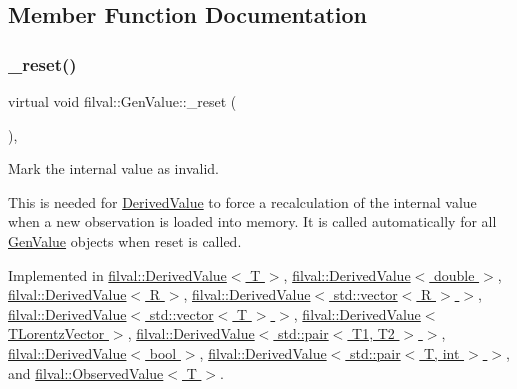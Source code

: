 \subsection{Member Function Documentation}
\hypertarget{classfilval_1_1GenValue_ae9d5bd9fde2d04f6cd05d5b901a8c78a}{}\label{classfilval_1_1GenValue_ae9d5bd9fde2d04f6cd05d5b901a8c78a} 
\subsubsection{\texorpdfstring{\+\_\+reset()}{\_reset()}}
{\footnotesize\ttfamily virtual void filval\+::\+Gen\+Value\+::\+\_\+reset (\begin{DoxyParamCaption}{ }\end{DoxyParamCaption})\hspace{0.3cm}{\ttfamily [protected]}, {}}



Mark the internal value as invalid. 

This is needed for \hyperlink{classfilval_1_1DerivedValue}{Derived\+Value} to force a recalculation of the internal value when a new observation is loaded into memory. It is called automatically for all \hyperlink{classfilval_1_1GenValue}{Gen\+Value} objects when reset is called. 

Implemented in \hyperlink{classfilval_1_1DerivedValue_a07fef8f98ae4b47e2c4d0f467aa0d6e3}{filval\+::\+Derived\+Value$<$ T $>$}, \hyperlink{classfilval_1_1DerivedValue_a07fef8f98ae4b47e2c4d0f467aa0d6e3}{filval\+::\+Derived\+Value$<$ double $>$}, \hyperlink{classfilval_1_1DerivedValue_a07fef8f98ae4b47e2c4d0f467aa0d6e3}{filval\+::\+Derived\+Value$<$ R $>$}, \hyperlink{classfilval_1_1DerivedValue_a07fef8f98ae4b47e2c4d0f467aa0d6e3}{filval\+::\+Derived\+Value$<$ std\+::vector$<$ R $>$ $>$}, \hyperlink{classfilval_1_1DerivedValue_a07fef8f98ae4b47e2c4d0f467aa0d6e3}{filval\+::\+Derived\+Value$<$ std\+::vector$<$ T $>$ $>$}, \hyperlink{classfilval_1_1DerivedValue_a07fef8f98ae4b47e2c4d0f467aa0d6e3}{filval\+::\+Derived\+Value$<$ T\+Lorentz\+Vector $>$}, \hyperlink{classfilval_1_1DerivedValue_a07fef8f98ae4b47e2c4d0f467aa0d6e3}{filval\+::\+Derived\+Value$<$ std\+::pair$<$ T1, T2 $>$ $>$}, \hyperlink{classfilval_1_1DerivedValue_a07fef8f98ae4b47e2c4d0f467aa0d6e3}{filval\+::\+Derived\+Value$<$ bool $>$}, \hyperlink{classfilval_1_1DerivedValue_a07fef8f98ae4b47e2c4d0f467aa0d6e3}{filval\+::\+Derived\+Value$<$ std\+::pair$<$ T, int $>$ $>$}, and \hyperlink{classfilval_1_1ObservedValue_a68c4fc1eb89682c7b16d2d46874f5421}{filval\+::\+Observed\+Value$<$ T $>$}.



